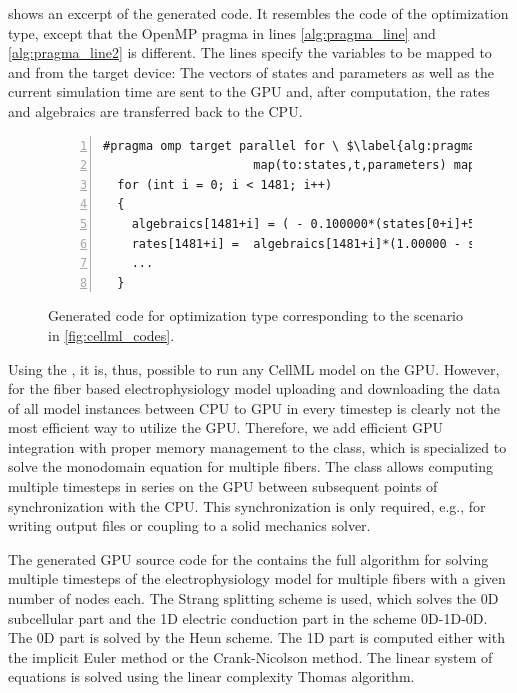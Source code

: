  shows an excerpt of the generated code. It resembles the code of the\break{} optimization type, except that the OpenMP pragma in lines \ref{alg:pragma_line} and \ref{alg:pragma_line2} is different. The lines specify the variables to be mapped to and from the target device: The vectors of states and parameters as well as the current simulation time  are sent to the GPU and, after computation, the rates and algebraics are transferred back to the CPU.

\begin{figure}
\centering
\begin{framed}
\begin{lstlisting}[basicstyle=\footnotesize\ttfamily,commentstyle=\color{gray},numbers=left]
  #pragma omp target parallel for \ $\label{alg:pragma_line}$
                     map(to:states,t,parameters) map(from:rates,algebraics) $\label{alg:pragma_line2}$
  for (int i = 0; i < 1481; i++)
  {
    algebraics[1481+i] = ( - 0.100000*(states[0+i]+50.0000))/(exp(- (states[0+i]+5
    rates[1481+i] =  algebraics[1481+i]*(1.00000 - states[1481+i]) -  algebraics[7
    ...
  }
\end{lstlisting}
\end{framed}
\caption{Generated code for optimization type  corresponding to the scenario in \cref{fig:cellml_codes}.}%
\label{fig:cellml_codes_gpu}%
\end{figure}

Using the , it is, thus, possible to run any CellML model on the GPU. 
However, for the fiber based electrophysiology model uploading and downloading the data of all model instances between CPU to GPU in every timestep is clearly not the most efficient way to utilize the GPU. Therefore, we add efficient GPU integration with proper memory management to the  class, which is specialized to solve the monodomain equation for multiple fibers. The class allows computing multiple timesteps in series on the GPU between subsequent points of synchronization with the CPU. This synchronization is only required, e.g., for writing output files or coupling to a solid mechanics solver.

The generated GPU source code for the  contains the full algorithm for solving multiple timesteps of the electrophysiology model for multiple fibers with a given number of nodes each. The Strang splitting scheme is used, which solves the 0D subcellular part and the 1D electric conduction part in the scheme 0D-1D-0D.
The 0D part is solved by the Heun scheme. The 1D part is computed either with the implicit Euler method or the Crank-Nicolson method. The linear system of equations is solved using the linear complexity Thomas algorithm.

